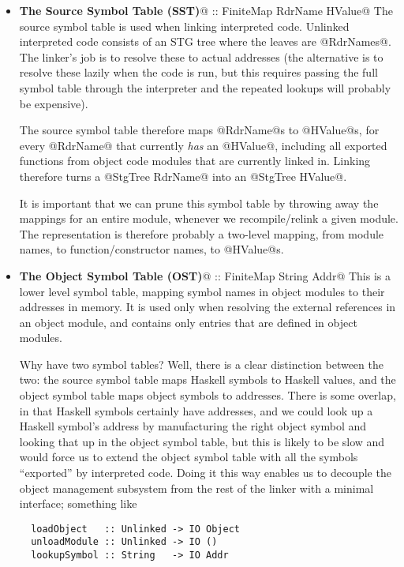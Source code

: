 \documentclass[11pt]{article}
\begin{document}
\begin{itemize}
\item 
\textbf{The Source Symbol Table (SST)}@ :: FiniteMap RdrName HValue@   
  The source symbol table is used when linking interpreted code.
  Unlinked interpreted code consists of an STG  tree where
  the leaves are @RdrNames@.  The linker's job is to resolve these to
  actual addresses (the alternative is to resolve these lazily when
  the code is run, but this requires passing the full symbol table
  through the interpreter and the repeated lookups will probably be
  expensive).

  The source symbol table therefore maps @RdrName@s to @HValue@s, for
  every @RdrName@ that currently \emph{has} an @HValue@, including all
  exported functions from object code modules that are currently
  linked in.  Linking therefore turns a @StgTree RdrName@ into an
  @StgTree HValue@.

  It is important that we can prune this symbol table by throwing away
  the mappings for an entire module, whenever we recompile/relink a
  given module.  The representation is therefore probably a two-level
  mapping, from module names, to function/constructor names, to
  @HValue@s.

\item \textbf{The Object Symbol Table (OST)}@ :: FiniteMap String Addr@
  This is a lower level symbol table, mapping symbol names in object
  modules to their addresses in memory.  It is used only when
  resolving the external references in an object module, and contains
  only entries that are defined in object modules.

  Why have two symbol tables?  Well, there is a clear distinction
  between the two: the source symbol table maps Haskell symbols to
  Haskell values, and the object symbol table maps object symbols to
  addresses.  There is some overlap, in that Haskell symbols certainly
  have addresses, and we could look up a Haskell symbol's address by
  manufacturing the right object symbol and looking that up in the
  object symbol table, but this is likely to be slow and would force
  us to extend the object symbol table with all the symbols
  ``exported'' by interpreted code.  Doing it this way enables us to
  decouple the object management subsystem from the rest of the linker
  with a minimal interface; something like

  \begin{verbatim}
  loadObject   :: Unlinked -> IO Object
  unloadModule :: Unlinked -> IO ()
  lookupSymbol :: String   -> IO Addr
  \end{verbatim}


\end{itemize}
\end{document}
